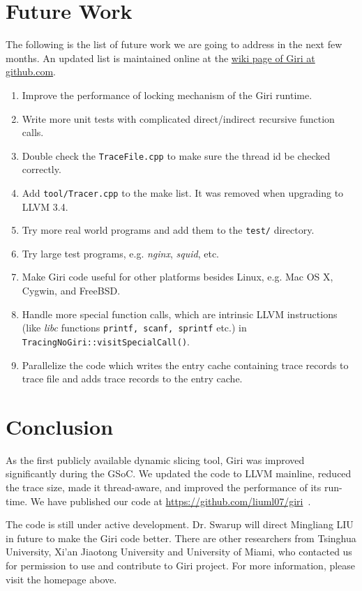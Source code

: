 \documentclass[DIV=calc, paper=a4, fontsize=11pt, twocolumn]{scrartcl}
\begin{document}
\section{Future Work}
The following is the list of future work we are going to address in the next few months.
An updated list is maintained online at the \href{https://github.com/liuml07/giri/wiki/TODO}{wiki page of Giri at github.com}.
\label{sec:todo}
\begin{enumerate}
	\item Improve the performance of locking mechanism of the Giri runtime.
	\item Write more unit tests with complicated direct/indirect recursive function calls.
	\item Double check the \texttt{TraceFile.cpp} to make sure the thread id be checked correctly.
	\item Add \texttt{tool/Tracer.cpp} to the make list. It was removed when upgrading to LLVM 3.4.
	\item Try more real world programs and add them to the \texttt{test/} directory.
	\item Try large test programs, e.g. \emph{nginx}, \emph{squid}, etc.
	\item Make Giri code useful for other platforms besides Linux, e.g. Mac OS X, Cygwin, and FreeBSD.
	\item Handle more special function calls, which are intrinsic LLVM instructions (like \emph{libc} functions \texttt{printf, scanf, sprintf} etc.) in \texttt{TracingNoGiri::visitSpecialCall()}.
	\item Parallelize the code which writes the entry cache containing trace records to trace file and adds trace records to the entry cache.
\end{enumerate}

\section{Conclusion}
\label{sec:contact}
As the first publicly available dynamic slicing tool,
Giri was improved significantly during the GSoC.
We updated the code to LLVM mainline, reduced the trace size, made it thread-aware, and improved the performance of its run-time.
We have published our code at \href{https://github.com/liuml07/giri}{https://github.com/liuml07/giri}~\cite{giri}.

The code is still under active development.
Dr. Swarup will direct Mingliang LIU in future to make the Giri code better.
There are other researchers from Tsinghua University, Xi'an Jiaotong University and University of Miami,
who contacted us for permission to use and contribute to Giri project.
For more information, please visit the homepage above.


 
\end{document}
